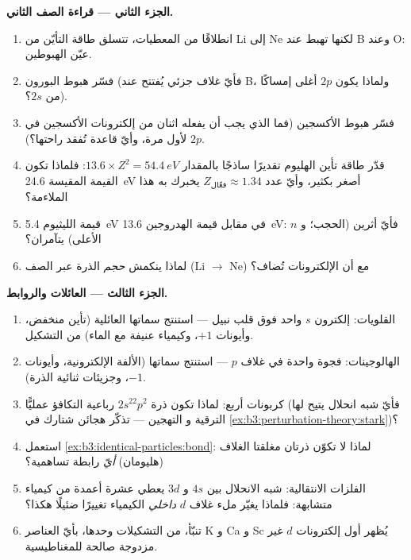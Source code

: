 \begin{problem}
\medskip\noindent\textbf{الجزء الثاني --- قراءة الصف الثاني.}
\begin{enumerate}[resume]
  \item انطلاقًا من المعطيات، تتسلق طاقة التأيّن من Li إلى Ne لكنها
        تهبط عند B وعند O: عيّن الهبوطين.
  \item فسّر هبوط البورون (فأيّ غلاف جزئي يُفتتح عند B، ولماذا
        يكون $2p$ أغلى إمساكًا من $2s$؟).
  \item فسّر هبوط الأكسجين (فما الذي يجب أن يفعله اثنان من
        إلكترونات الأكسجين في $2p$ لأول مرة، وأيّ قاعدة تُفقد
        راحتها؟).
  \item قدّر طاقة تأين الهليوم تقديرًا ساذجًا بالمقدار
        $13.6 \times Z^2 = \qty{54.4}{eV}$: فلماذا تكون القيمة المقيسة
        \qty{24.6}{eV} أصغر بكثير، وأيّ عدد
        $Z_{\text{فعّال}} \approx 1.34$ يخبرك به هذا الملاءمة؟
  \item قيمة الليثيوم \qty{5.4}{eV} في مقابل قيمة الهدروجين \qty{13.6}{eV}:
        فأيّ أثرين (الحجب؛ و $n$ الأعلى) يتآمران؟
  \item لماذا ينكمش \emph{حجم} الذرة عبر الصف
        (Li $\to$ Ne) مع أن الإلكترونات تُضاف؟
\end{enumerate}

\medskip\noindent\textbf{الجزء الثالث --- العائلات والروابط.}
\begin{enumerate}[resume]
  \item القلويات: إلكترون $s$ واحد فوق قلب نبيل --- استنتج
        سماتها العائلية (تأين منخفض، وأيونات $+1$، وكيمياء
        عنيفة مع الماء) من التشكيل.
  \item الهالوجينات: فجوة واحدة في غلاف $p$ --- استنتج سماتها
        (الألفة الإلكترونية، وأيونات $-1$، وجزيئات ثنائية الذرة).
  \item كربونات أربع: لماذا تكون ذرة $2s^22p^2$ رباعية التكافؤ
        عمليًّا (فأيّ شبه انحلال يتيح لها الترقية و
        التهجين --- تذكّر هجائن شتارك في
        \cref{ex:b3:perturbation-theory:stark})؟
  \item استعمل \cref{ex:b3:identical-particles:bond}: لماذا لا تكوّن
        ذرتان مغلقتا الغلاف (هليومان) \emph{أيّ} رابطة
        تساهمية؟
  \item الفلزات الانتقالية: شبه الانحلال بين $4s$ و $3d$ يعطي عشرة
        أعمدة من كيمياء متشابهة: فلماذا يغيّر ملء غلاف
        $d$ \emph{داخلي} الكيمياء تغييرًا ضئيلًا هكذا؟
  \item تنبّأ، من التشكيلات وحدها، بأيّ العناصر K و Ca و Sc
        يُظهر أول إلكترونات $d$ غير مزدوجة صالحة للمغناطيسية.
\end{enumerate}


\end{problem}
